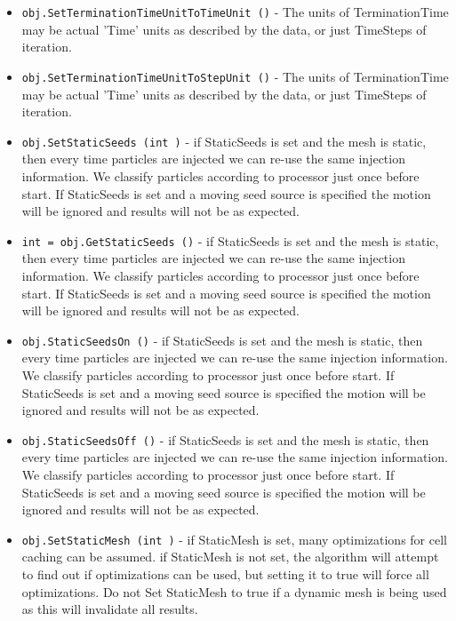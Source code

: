 \begin{itemize}
\item  \verb|obj.SetTerminationTimeUnitToTimeUnit ()| -  The units of TerminationTime may be actual 'Time' units as described
 by the data, or just TimeSteps of iteration.

\item  \verb|obj.SetTerminationTimeUnitToStepUnit ()| -  The units of TerminationTime may be actual 'Time' units as described
 by the data, or just TimeSteps of iteration.

\item  \verb|obj.SetStaticSeeds (int )| -  if StaticSeeds is set and the mesh is static, 
 then every time particles are injected we can re-use the same 
 injection information. We classify particles according to
 processor just once before start.
 If StaticSeeds is set and a moving seed source is specified
 the motion will be ignored and results will not be as expected.

\item  \verb|int = obj.GetStaticSeeds ()| -  if StaticSeeds is set and the mesh is static, 
 then every time particles are injected we can re-use the same 
 injection information. We classify particles according to
 processor just once before start.
 If StaticSeeds is set and a moving seed source is specified
 the motion will be ignored and results will not be as expected.

\item  \verb|obj.StaticSeedsOn ()| -  if StaticSeeds is set and the mesh is static, 
 then every time particles are injected we can re-use the same 
 injection information. We classify particles according to
 processor just once before start.
 If StaticSeeds is set and a moving seed source is specified
 the motion will be ignored and results will not be as expected.

\item  \verb|obj.StaticSeedsOff ()| -  if StaticSeeds is set and the mesh is static, 
 then every time particles are injected we can re-use the same 
 injection information. We classify particles according to
 processor just once before start.
 If StaticSeeds is set and a moving seed source is specified
 the motion will be ignored and results will not be as expected.

\item  \verb|obj.SetStaticMesh (int )| -  if StaticMesh is set, many optimizations for cell caching
 can be assumed. if StaticMesh is not set, the algorithm
 will attempt to find out if optimizations can be used, but
 setting it to true will force all optimizations.
 Do not Set StaticMesh to true if a dynamic mesh is being used
 as this will invalidate all results.


\end{itemize}

